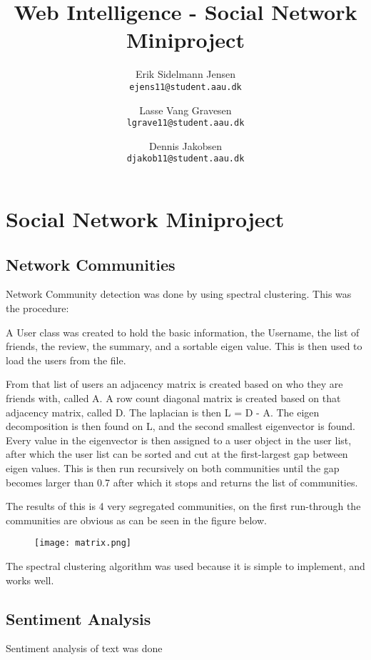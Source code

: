 

\author{
  Erik Sidelmann Jensen\\
  \texttt{ejens11@student.aau.dk}
  \and
  Lasse Vang Gravesen\\
  \texttt{lgrave11@student.aau.dk}
  \and
  Dennis Jakobsen\\
  \texttt{djakob11@student.aau.dk}  
}

\title{Web Intelligence - Social Network Miniproject}
\date{}


	\clearpage\maketitle
	\thispagestyle{empty}
	
	\chapter{Social Network Miniproject}
	\section{Network Communities}
	Network Community detection was done by using spectral clustering. This was the procedure:
	
	A User class was created to hold the basic information, the Username, the list of friends, the review, the summary, and a sortable eigen value. This is then used to load the users from the file.
	
	From that list of users an adjacency matrix is created based on who they are friends with, called A. A row count diagonal matrix is created based on that adjacency matrix, called D. The laplacian is then L = D - A. The eigen decomposition is then found on L, and the second smallest eigenvector is found. Every value in the eigenvector is then assigned to a user object in the user list, after which the user list can be sorted and cut at the first-largest gap between eigen values. This is then run recursively on both communities until the gap becomes larger than 0.7 after which it stops and returns the list of communities.
	
	The results of this is 4 very segregated communities, on the first run-through the communities are obvious as can be seen in the figure below.
	
	\begin{figure}[H]
	\texttt{[image: matrix.png]}
	\end{figure}
	
	The spectral clustering algorithm was used because it is simple to implement, and works well.
	
	\section{Sentiment Analysis}
	Sentiment analysis of text was done 


